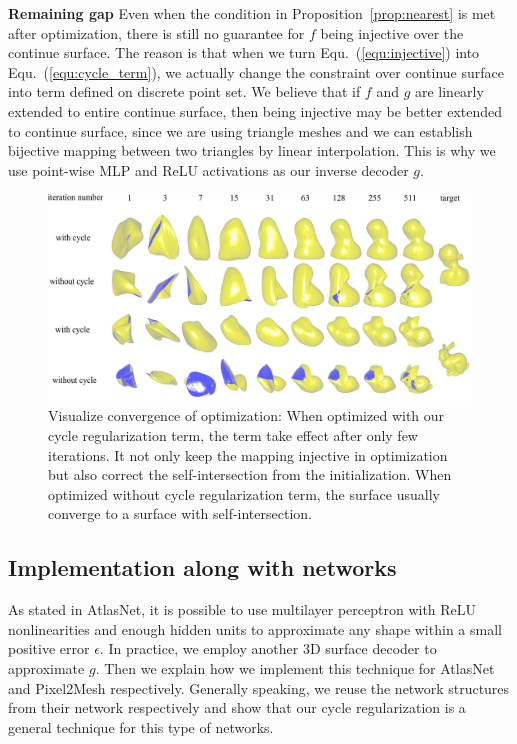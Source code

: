 \noindent\textbf{Remaining gap}
Even when the condition in Proposition~\ref{prop:nearest} is met after optimization, there is still no guarantee for $f$ being injective over the continue surface. The reason is that when we turn Equ.~(\ref{equ:injective}) into Equ.~(\ref{equ:cycle_term}), we actually change the constraint over continue surface into term defined on discrete point set. We believe that if $f$ and $g$ are linearly extended to entire continue surface, then being injective may be better extended to continue surface, since we are using triangle meshes and we can establish bijective mapping between two triangles by linear interpolation. This is why we use point-wise MLP and ReLU activations as our inverse decoder $g$.
\begin{figure}[htbp]
	\centering
	\includegraphics[width=\linewidth]{img/opt/opt}
	\caption{Visualize convergence of optimization: When optimized with our cycle regularization term, the term take effect after only few iterations. It not only keep the mapping injective in optimization but also correct the self-intersection from the initialization. When optimized without cycle regularization term, the surface usually converge to a surface with self-intersection.}
	\label{fig:opt}
\end{figure}
\subsection{Implementation along with networks}

As stated in AtlasNet\cite{atlasnet}, it is possible to use multilayer perceptron with ReLU nonlinearities and enough hidden units to approximate any shape within a small positive error $\epsilon$. In practice, we employ another 3D surface decoder to approximate $g$. Then we explain how we implement this technique for AtlasNet and Pixel2Mesh respectively. Generally speaking, we reuse the network structures from their network respectively and show that our cycle regularization is a general technique for this type of networks.

